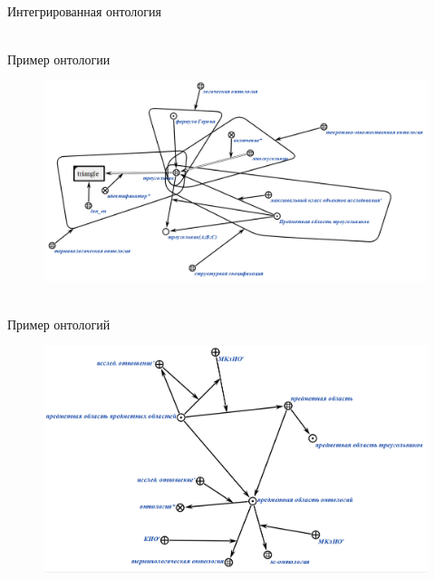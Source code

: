 \begin{frame}{\\Интегрированная онтология}
	\topline
	\justifying 
	\begin{SCn}
		
	\end{SCn}
\end{frame}

\begin{frame}{\\Пример онтологии}
	\topline
	\justifying 
	\vspace{10mm}
	\begin{figure}[H]
	\includegraphics[scale=0.35]{./figures/sd_ontologies/ontology1.png}
	\end{figure}
\end{frame}

\begin{frame}{\\Пример онтологий}
	\topline
	\justifying 
	\vspace{10mm}
	\begin{figure}[H]
		\includegraphics[scale=0.33]{./figures/sd_ontologies/ontology2.png}
	\end{figure}
\end{frame}

